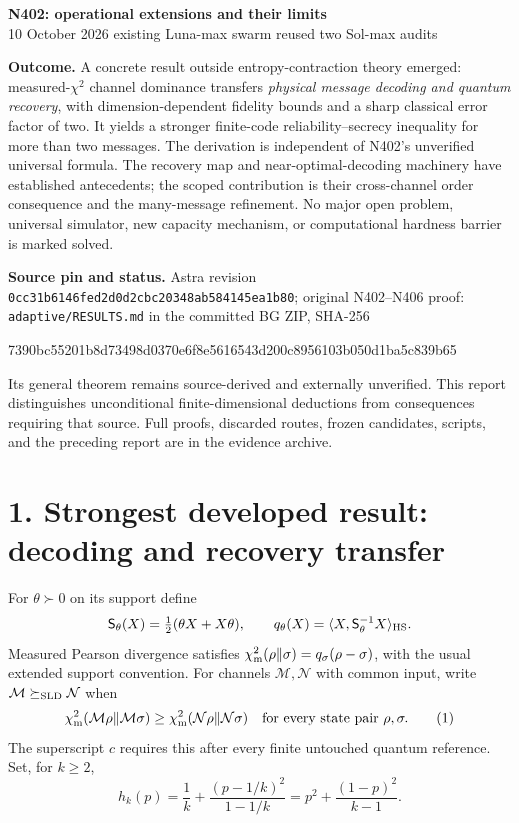 \documentclass[10pt,a4paper]{article}
\newcommand{\N}{\mathcal N}
\newcommand{\M}{\mathcal M}
\newcommand{\Sld}{\mathsf S}
\begin{document}
\begin{center}
{\Large\bfseries N402: operational extensions and their limits}\\[4pt]
{\small 10 October 2026 \quad existing Luna-max swarm reused \quad two Sol-max audits}
\end{center}

\textbf{Outcome.} A concrete result outside entropy-contraction theory emerged: measured-$\chi^2$ channel dominance transfers \emph{physical message decoding and quantum recovery}, with dimension-dependent fidelity bounds and a sharp classical error factor of two. It yields a stronger finite-code reliability--secrecy inequality for more than two messages. The derivation is independent of N402's unverified universal formula. The recovery map and near-optimal-decoding machinery have established antecedents; the scoped contribution is their cross-channel order consequence and the many-message refinement. No major open problem, universal simulator, new capacity mechanism, or computational hardness barrier is marked solved.

\textbf{Source pin and status.} Astra revision \texttt{0cc31b6146fed2d0d2cbc20348ab584145ea1b80}; original N402--N406 proof: \texttt{adaptive/RESULTS.md} in the committed BG ZIP, SHA-256
\par{\footnotesize\ttfamily 7390bc55201b8d73498d0370e6f8e5616543d200c8956103b050d1ba5c839b65}\par
Its general theorem remains source-derived and externally unverified. This report distinguishes unconditional finite-dimensional deductions from consequences requiring that source. Full proofs, discarded routes, frozen candidates, scripts, and the preceding report are in the evidence archive.

\section*{1. Strongest developed result: decoding and recovery transfer}

For $\theta\succ0$ on its support define
\[
 \Sld_\theta(X)=\tfrac12(\theta X+X\theta),\qquad
 q_\theta(X)=\langle X,\Sld_\theta^{-1}X\rangle_{\rm HS}.
\]
Measured Pearson divergence satisfies
$\chi^2_{\rm m}(\rho\|\sigma)=q_\sigma(\rho-\sigma)$, with the usual extended support convention.
For channels $\M,\N$ with common input, write $\M\succeq_{\rm SLD}\N$ when
\[
 \chi^2_{\rm m}(\M\rho\|\M\sigma)\ge
 \chi^2_{\rm m}(\N\rho\|\N\sigma)\quad\hbox{for every state pair }\rho,\sigma. \tag{1}
\]
The superscript $c$ requires this after every finite untouched quantum reference.
Set, for $k\ge2$,
\[
 h_k(p)=\frac1k+\frac{(p-1/k)^2}{1-1/k}
       =p^2+\frac{(1-p)^2}{k-1}. \tag{2}
\]
\end{document}
